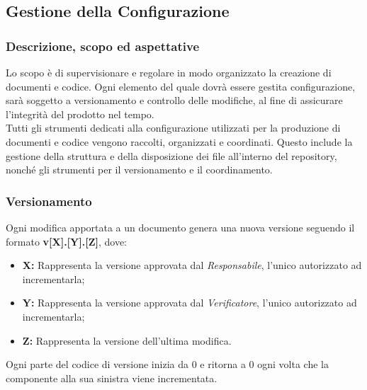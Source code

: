 \pagebreak
\pagebreak
\subsection{Gestione della Configurazione}

\subsubsection{Descrizione, scopo ed aspettative}
    Lo scopo è di supervisionare e regolare in modo organizzato la creazione di
    documenti e codice. Ogni elemento del quale dovrà essere gestita configurazione, sarà soggetto a versionamento
    e controllo delle modifiche, al fine di assicurare l'integrità del prodotto
    nel tempo.
    \\
    Tutti gli strumenti dedicati alla configurazione utilizzati per la produzione
    di documenti e codice vengono raccolti, organizzati e coordinati. Questo include
    la gestione della struttura e della disposizione dei file all'interno del repository,
    nonché gli strumenti per il versionamento e il coordinamento.

\subsubsection{Versionamento}
Ogni modifica apportata a un documento genera una nuova versione seguendo il formato
\textbf{v[X].[Y].[Z]}, dove:
\begin{itemize}
    \item \textbf{X:} Rappresenta la versione approvata dal \emph{Responsabile}, l'unico autorizzato ad incrementarla;
    \item \textbf{Y:} Rappresenta la versione approvata dal \emph{Verificatore}, l'unico autorizzato ad incrementarla;
    \item \textbf{Z:} Rappresenta la versione dell'ultima modifica.
\end{itemize}
Ogni parte del codice di versione inizia da 0 e ritorna a 0 ogni volta che la componente alla sua sinistra
viene incrementata.
